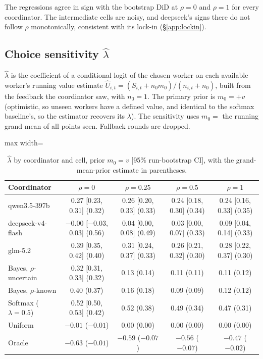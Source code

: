 \documentclass[11pt,letterpaper]{article}
\newcommand{\did}{\mathrm{DiD}}
\numberwithin{equation}{section}
\numberwithin{table}{section}
\numberwithin{figure}{section}
\numberwithin{algorithm}{section}
\begin{document}
\noindent The regressions agree in sign with the bootstrap $\did$ at $\rho=0$ and $\rho=1$ for every coordinator. The intermediate cells are noisy, and deepseek's signs there do not follow $\rho$ monotonically, consistent with its lock-in (\S\ref{app:lockin}).

\subsection{Choice sensitivity $\hat\lambda$}\label{app:lambda}

$\hat\lambda$ is the coefficient of a conditional logit of the chosen worker on each available worker's running value estimate $\hat U_{i,t}=(S_{i,t}+n_0m_0)/(n_{i,t}+n_0)$, built from the feedback the coordinator saw, with $n_0=1$. The primary prior is $m_0=+v$ (optimistic, so unseen workers have a defined value, and identical to the softmax baseline's, so the estimator recovers its $\lambda$). The sensitivity uses $m_0=$ the running grand mean of all points seen. Fallback rounds are dropped.

\begin{table}[h]
\centering\small
\caption{$\hat\lambda$ by coordinator and cell, prior $m_0=v$ [95\% run-bootstrap CI], with the grand-mean-prior estimate in parentheses.}
\label{tab:lambda}
\begin{adjustbox}{max width=\linewidth}
\begin{tabular}{lcccc}
\toprule
Coordinator & $\rho=0$ & $\rho=0.25$ & $\rho=0.5$ & $\rho=1$ \\
\midrule
qwen3.5-397b & 0.27 [0.23, 0.31] (0.32) & 0.26 [0.20, 0.33] (0.33) & 0.24 [0.18, 0.30] (0.34) & 0.24 [0.16, 0.33] (0.35) \\
deepseek-v4-flash & $-0.00$ [$-0.03$, 0.03] (0.56) & 0.04 [0.00, 0.08] (0.49) & 0.03 [0.00, 0.07] (0.33) & 0.09 [0.04, 0.14] (0.33) \\
glm-5.2 & 0.39 [0.35, 0.42] (0.40) & 0.31 [0.24, 0.37] (0.33) & 0.26 [0.21, 0.32] (0.30) & 0.28 [0.22, 0.37] (0.30) \\
\addlinespace
Bayes, $\rho$-uncertain & 0.32 [0.31, 0.33] (0.32) & 0.13 (0.14) & 0.11 (0.11) & 0.11 (0.12) \\
Bayes, $\rho$-known & 0.40 (0.37) & 0.16 (0.18) & 0.09 (0.09) & 0.12 (0.12) \\
Softmax ($\lambda=0.5$) & 0.52 [0.50, 0.53] (0.42) & 0.52 (0.38) & 0.49 (0.34) & 0.47 (0.31) \\
Uniform & $-0.01$ ($-0.01$) & 0.00 (0.00) & 0.00 (0.00) & 0.00 (0.00) \\
Oracle & $-0.63$ ($-0.01$) & $-0.59$ ($-0.07$) & $-0.56$ ($-0.07$) & $-0.47$ ($-0.02$) \\
\bottomrule
\end{tabular}
\end{adjustbox}
\end{table}
\end{document}
